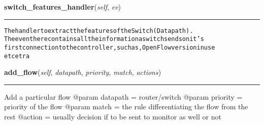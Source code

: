 \hspace{.8\funcindent}\begin{boxedminipage}{\funcwidth}

    \raggedright \textbf{switch\_features\_handler}(\textit{self}, \textit{ev})

    \vspace{-1.5ex}

    \rule{\textwidth}{0.5\fboxrule}
\setlength{\parskip}{2ex}
\begin{alltt}
The handler to extract the features of the Switch (Datapath).
 The event here contains all the information a switch sends on it's
first connection to the controller, such as, OpenFlow version in use
et cetra
\end{alltt}

\setlength{\parskip}{1ex}
    \end{boxedminipage}

    \label{sdn_flowsampling:FlowSampRyu:controller:flow_samp:FlowSamp:add_flow}

    \vspace{0.5ex}

\hspace{.8\funcindent}\begin{boxedminipage}{\funcwidth}

    \raggedright \textbf{add\_flow}(\textit{self}, \textit{datapath}, \textit{priority}, \textit{match}, \textit{actions})

    \vspace{-1.5ex}

    \rule{\textwidth}{0.5\fboxrule}
\setlength{\parskip}{2ex}
    Add a particular flow @param datapath = router/switch @param priority =
    priority of the flow @param match = the rule differentiating the flow 
    from the rest @action = usually decision if to be sent to monitor as 
    well or not

\setlength{\parskip}{1ex}
    \end{boxedminipage}

    \label{sdn_flowsampling:FlowSampRyu:controller:flow_samp:FlowSamp:build_flow_string}

